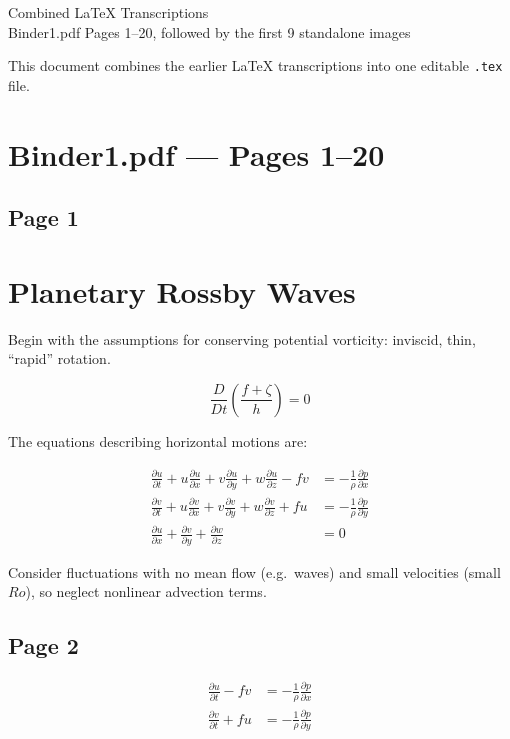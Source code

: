 \documentclass[11pt]{article}
\begin{document}
\begin{center}
{\LARGE Combined LaTeX Transcriptions}\\[0.5em]
{\large Binder1.pdf Pages 1--20, followed by the first 9 standalone images}
\end{center}

This document combines the earlier LaTeX transcriptions into one editable \texttt{.tex} file.

\section*{Binder1.pdf --- Pages 1--20}

\subsection*{Page 1}
\section*{Planetary Rossby Waves}

Begin with the assumptions for conserving potential vorticity: inviscid, thin, ``rapid'' rotation.

\[
\frac{D}{Dt}\left(\frac{f+\zeta}{h}\right)=0
\]

The equations describing horizontal motions are:

\begin{align}
\frac{\partial u}{\partial t}
+u\frac{\partial u}{\partial x}
+v\frac{\partial u}{\partial y}
+w\frac{\partial u}{\partial z}
-fv
&=
-\frac{1}{\rho}\frac{\partial p}{\partial x}
\tag{1}\\[6pt]
\frac{\partial v}{\partial t}
+u\frac{\partial v}{\partial x}
+v\frac{\partial v}{\partial y}
+w\frac{\partial v}{\partial z}
+fu
&=
-\frac{1}{\rho}\frac{\partial p}{\partial y}
\tag{2}\\[6pt]
\frac{\partial u}{\partial x}
+\frac{\partial v}{\partial y}
+\frac{\partial w}{\partial z}
&=0
\tag{3}
\end{align}

Consider fluctuations with no mean flow (e.g.\ waves) and small velocities
(small $Ro$), so neglect nonlinear advection terms.

\subsection*{Page 2}
\begin{align}
\frac{\partial u}{\partial t}-fv
&=
-\frac{1}{\rho}\frac{\partial p}{\partial x}
\tag{1}\\[6pt]
\frac{\partial v}{\partial t}+fu
&=
-\frac{1}{\rho}\frac{\partial p}{\partial y}
\tag{2}
\end{align}
\end{document}
